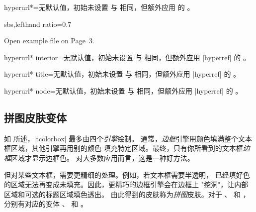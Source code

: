 \begin{docTcbKey}[][doc new=2017-02-03]{hyperurl*}{=}{无默认值，初始未设置}
  与  相同，但额外应用
   \cite{rahtz:hyperref} 的 。
  \begin{dispExample*}{sbs,lefthand ratio=0.7}
\begin{tcolorbox}[enhanced,colback=green!50,
  hyperurl*={page=3,pdfnewwindow=true}%
            {tcolorbox-example.pdf}]
Open example file on Page~3.
\end{tcolorbox}
  \end{dispExample*}
\end{docTcbKey}

\begin{docTcbKey}[][doc new=2017-02-03]{hyperurl* interior}{=}{无默认值，初始未设置}
  与  相同，但额外应用 |hyperref| \cite{rahtz:hyperref}
  的 。
\end{docTcbKey}

\begin{docTcbKey}[][doc new=2017-02-03]{hyperurl* title}{=}{无默认值，初始未设置}
  与  相同，但额外应用 |hyperref| \cite{rahtz:hyperref}
  的 。
\end{docTcbKey}

\enlargethispage*{1cm}

\begin{docTcbKey}[][doc new=2017-02-03]{hyperurl* node}{=}{无默认值，初始未设置}
  与  相同，但额外应用 |hyperref| \cite{rahtz:hyperref}
  的 。
\end{docTcbKey}



\clearpage
\subsection{拼图皮肤变体}\label{subsec:skinjigsaw}
如  所述，|tcolorbox| 最多由四个\emph{引擎}绘制。
通常，\emph{边框}引擎用颜色填满整个文本框区域，其他引擎再用别的颜色
填充特定区域。最终，只有你所看到的文本框\emph{边框}区域才显示边框色。
对大多数应用而言，这是一种好方法。

但对某些文本框，需要更精细的处理。例如，若文本框需要半透明，
已经填好色的区域无法再变成未填充。因此，更精巧的边框引擎会在边框上
"挖洞"，让内部区域和可选的标题区域填色透出。
由此得到的皮肤称为\emph{拼图}皮肤。对于 、
 和 ，分别有对应的变体
、 和 。


